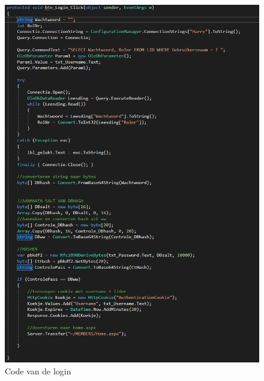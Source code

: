 \documentclass[11pt]{article}
\begin{document}
	\newpage
	\begin{figure}[h]
		\centering
		\includegraphics[scale=0.8]{CodeLogin}
		\caption{Code van de login}
		\label{LoginCode}
	\end{figure}
\end{document}

